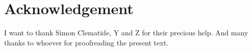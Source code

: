 {}
\chapter*{Acknowledgement}

I want to thank Simon Clematide, Y and Z for their precious help.
And many thanks to whoever for proofreading the present text.

\newpage
